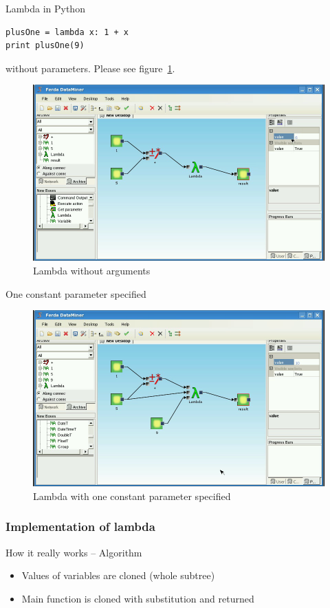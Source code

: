 \documentclass[a4paper,12pt]{book}
\begin{document}
Lambda in Python
\begin{verbatim}
plusOne = lambda x: 1 + x
print plusOne(9)
\end{verbatim}

without parameters. Please see figure~\ref{fig:boxLambdaBasic}.
\begin{figure}
\includegraphics[width=13.72cm]{lambdaBasic2.png}
	\caption{Lambda without arguments}
	\label{fig:boxLambdaBasic}
\end{figure}

One constant parameter specified
\begin{figure}
\includegraphics[width=13.72cm]{lambdaBasic3.png}
	\caption{Lambda with one constant parameter specified}
\end{figure}
	
\subsubsection{Implementation of lambda}
How it really works -- Algorithm
\begin{itemize}
	\item Values of variables are cloned (whole subtree)
	\item Main function is cloned with substitution and returned
\end{itemize}
\end{document}
